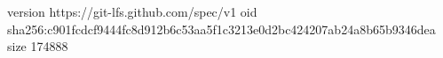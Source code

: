 version https://git-lfs.github.com/spec/v1
oid sha256:c901fcdcf9444fc8d912b6c53aa5f1c3213e0d2bc424207ab24a8b65b9346dea
size 174888
